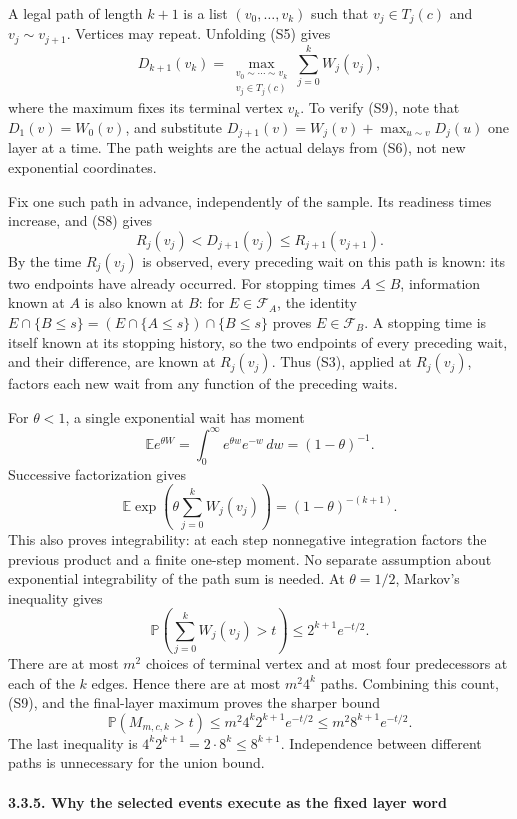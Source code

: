 \documentclass[
  11pt,
  a4paper,
]{article}
\begin{document}
A legal path of length \(k+1\) is a list \((v_0,\ldots,v_k)\) such that
\(v_j\in T_j(c)\) and \(v_j\sim v_{j+1}\). Vertices may repeat.
Unfolding (S5) gives \[
D_{k+1}(v_k)
=\max_{\substack{v_0\sim\cdots\sim v_k\\v_j\in T_j(c)}}
 \sum_{j=0}^k W_j(v_j),
\tag{S9}
\] where the maximum fixes its terminal vertex \(v_k\). To verify (S9),
note that \(D_1(v)=W_0(v)\), and substitute
\(D_{j+1}(v)=W_j(v)+\max_{u\sim v}D_j(u)\) one layer at a time. The path
weights are the actual delays from (S6), not new exponential
coordinates.

Fix one such path in advance, independently of the sample. Its readiness
times increase, and (S8) gives \[
R_j(v_j)<D_{j+1}(v_j)\leq R_{j+1}(v_{j+1}).
\] By the time \(R_j(v_j)\) is observed, every preceding wait on this
path is known: its two endpoints have already occurred. For stopping
times \(A\leq B\), information known at \(A\) is also known at \(B\):
for \(E\in\mathcal F_A\), the identity
\(E\cap\{B\leq s\}=(E\cap\{A\leq s\})\cap\{B\leq s\}\) proves
\(E\in\mathcal F_B\). A stopping time is itself known at its stopping
history, so the two endpoints of every preceding wait, and their
difference, are known at \(R_j(v_j)\). Thus (S3), applied at
\(R_j(v_j)\), factors each new wait from any function of the preceding
waits.

For \(\theta<1\), a single exponential wait has moment \[
\mathbb E e^{\theta W}=\int_0^\infty e^{\theta w}e^{-w}\,dw=(1-\theta)^{-1}.
\] Successive factorization gives \[
\mathbb E\exp\!\left(\theta\sum_{j=0}^k W_j(v_j)\right)
=(1-\theta)^{-(k+1)}.
\tag{S10}
\] This also proves integrability: at each step nonnegative integration
factors the previous product and a finite one-step moment. No separate
assumption about exponential integrability of the path sum is needed. At
\(\theta=1/2\), Markov's inequality gives \[
\mathbb P\left(\sum_{j=0}^kW_j(v_j)>t\right)
\leq 2^{k+1}e^{-t/2}.
\] There are at most \(m^2\) choices of terminal vertex and at most four
predecessors at each of the \(k\) edges. Hence there are at most
\(m^2 4^k\) paths. Combining this count, (S9), and the final-layer
maximum proves the sharper bound \[
\mathbb P(M_{m,c,k}>t)
\leq m^2 4^k2^{k+1}e^{-t/2}
\leq m^2 8^{k+1}e^{-t/2}.
\tag{S11}
\] The last inequality is \(4^k2^{k+1}=2\cdot8^k\leq8^{k+1}\).
Independence between different paths is unnecessary for the union bound.

\paragraph{3.3.5. Why the selected events execute as the fixed layer
word}\label{why-the-selected-events-execute-as-the-fixed-layer-word}
\end{document}
